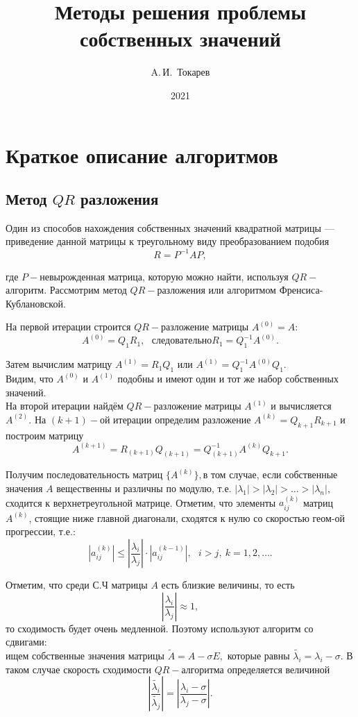 \documentclass[12pt, a4paper]{article}
\title{Методы решения проблемы собственных значений}
\author{A.\,И.~Токарев}
\date{2021}
\begin{document}
    \maketitle
    \tableofcontents 
    \newpage

    \section{Краткое описание алгоритмов}

    \subsection{Метод $QR$ разложения}

    Один из способов нахождения собственных значений квадратной матрицы --- приведение данной матрицы к треугольному виду преобразованием подобия
    \[
        R=P^{-1}AP,
    \]

    \noindent где $P-$невырожденная матрица, которую можно найти, используя $QR-$алгоритм. Рассмотрим метод $QR-$разложения или алгоритмом Френсиса-Кублановской.

    На первой итерации строится $QR-$разложение матрицы $A^{(0)}=A\colon$
    \[
        A^{(0)}=Q_{1}R_{1},~~~ следовательно R_{1}=Q_{1}^{-1}A^{(0)}.
    \]

    Затем вычислим матрицу $A^{(1)}=R_{1}Q_{1}$ или $A^{(1)}=Q_{1}^{-1}A^{(0)}Q_{1}$.\\
    Видим, что $A^{(0)}$ и $A^{(1)}$ подобны и имеют один и тот же набор собственных значений.\\
    На второй итерации найдём $QR-$разложение матрицы $A^{(1)}$ и вычисляется $A^{(2)}.$ На $(k+1)-$ой итерации определим разложение $A^{(k)}=Q_{k+1}R_{k+1}$ и построим матрицу 
    \[
        A^{(k+1)}=R_{(k+1)}Q_{(k+1)}=Q_{(k+1)}^{-1}A^{(k)}Q_{k+1}.
    \]
    
    Получим последовательность матриц $\{A^{(k)}\},$в том случае, если собственные значения $A$ вещественны и различны по модулю, т.е. $|\lambda_{1}|>|\lambda_{2}|>\ldots > |\lambda_{n}|,$ сходится к верхнетреугольной матрице. Отметим, что элементы $a_{ij}^{(k)}$ матриц $A^{(k)}$, стоящие ниже главной диагонали, сходятся к нулю со скоростью геом-ой прогрессии, т.е.:
    \[
        |a_{ij}^{(k)}| \leq |\frac{\lambda_{i}}{\lambda_{j}}| \cdot |a_{ij}^{(k-1)}|,~~~i>j,~k=1,2,\ldots. 
    \]

    Отметим, что среди С.Ч матрицы $A$ есть близкие величины, то есть
    \[
        |\frac{\lambda_{i}}{\lambda_{j}}| \approx 1,
    \]
    то сходимость будет очень медленной. Поэтому используют алгоритм со сдвигами: \\
    ищем собственные значения матрицы $\widetilde{A} = A - \sigma E,$ которые равны $\widetilde{\lambda_{i}} = \lambda_{i} - \sigma.$
    В таком случае скорость сходимости $QR-$алгоритма определяется величиной
    \[
        \left|\frac{\widetilde{\lambda_{i}}}{\widetilde{\lambda_{j}}}\right|=\left|\frac{\lambda_{i}-\sigma}{\lambda_{j}-\sigma}\right|.
    \]
\end{document}
